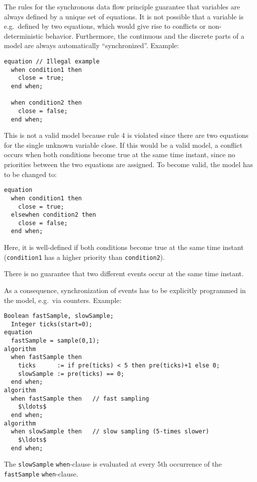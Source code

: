 \begin{nonnormative}
The rules for the synchronous data flow principle guarantee
that variables are always defined by a unique set of equations. It is
not possible that a variable is e.g.\ defined by two equations, which
would give rise to conflicts or non-deterministic behavior. Furthermore,
the continuous and the discrete parts of a model are always
automatically ``synchronized''. Example:
\begin{lstlisting}[language=modelica]
equation // Illegal example
  when condition1 then
    close = true;
  end when;

  when condition2 then
    close = false;
  end when;
\end{lstlisting}

This is not a valid model because rule 4 is violated since there
are two equations for the single unknown variable close. If this would
be a valid model, a conflict occurs when both conditions become true at
the same time instant, since no priorities between the two equations are
assigned. To become valid, the model has to be changed to:
\begin{lstlisting}[language=modelica]
equation
  when condition1 then
    close = true;
  elsewhen condition2 then
    close = false;
  end when;
\end{lstlisting}

Here, it is well-defined if both conditions become true at the
same time instant (\lstinline!condition1! has a higher priority than
\lstinline!condition2!).
\end{nonnormative}

There is no guarantee that two different events occur at the same time
instant.

\begin{nonnormative}
As a consequence, synchronization of events has to be
explicitly programmed in the model, e.g.\ via counters. Example:
\begin{lstlisting}[language=modelica]
  Boolean fastSample, slowSample;
  Integer ticks(start=0);
equation
  fastSample = sample(0,1);
algorithm
  when fastSample then
    ticks      := if pre(ticks) < 5 then pre(ticks)+1 else 0;
    slowSample := pre(ticks) == 0;
  end when;
algorithm
  when fastSample then   // fast sampling
    $\ldots$
  end when;
algorithm
  when slowSample then   // slow sampling (5-times slower)
    $\ldots$
  end when;
\end{lstlisting}

The \lstinline!slowSample! \lstinline!when!-clause is evaluated at every 5th occurrence of the
\lstinline!fastSample! \lstinline!when!-clause.
\end{nonnormative}


